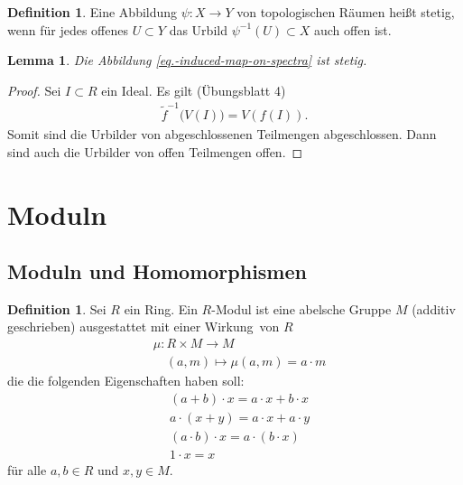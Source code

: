 \documentclass[reqno,12pt]{article}
\numberwithin{equation}{section}
\newcommand{\wt}{\widetilde}
\theoremstyle{plain}
\newtheorem{lemma}[thm]{Lemma}
\theoremstyle{definition}
\newtheorem{definition}[thm]{Definition}
\begin{document}
\begin{definition}
  Eine Abbildung $\psi \colon X \to Y$ von topologischen Räumen heißt {\sf stetig}, wenn für jedes offenes $U \subset Y$ das Urbild $\psi^{-1}(U) \subset X$ auch offen ist.
\end{definition}


\begin{lemma}
Die Abbildung \eqref{eq.-induced-map-on-spectra} ist stetig.
\end{lemma}



\begin{proof}
Sei $I \subset R$ ein Ideal. Es gilt (Übungsblatt 4)
\begin{align*}
\wt{f}^{-1}\big( V(I) \big) = V(f(I)).
\end{align*}
Somit sind die Urbilder von abgeschlossenen Teilmengen abgeschlossen. Dann sind auch die Urbilder von offen Teilmengen offen.
\end{proof}












\section{Moduln}

\subsection{Moduln und Homomorphismen}

\begin{definition}
Sei $R$ ein Ring. Ein $R$-Modul ist eine abelsche Gruppe $M$ (additiv geschrieben) ausgestattet mit einer \glqq Wirkung\grqq\, von $R$
\begin{align*}
  & \mu \colon R \times M \to M \\
  & \quad  (a,m) \mapsto \mu(a,m) = a \cdot m
\end{align*}
die die folgenden Eigenschaften haben soll:
\begin{align*}
  & (a+b) \cdot x = a \cdot x + b \cdot x \\
  & a \cdot (x+y) = a \cdot x + a \cdot y \\
  & (a \cdot b) \cdot x = a \cdot (b \cdot x) \\
  & 1 \cdot x = x
\end{align*}
für alle $a,b \in R$ und $x,y \in M$.
\end{definition}
\end{document}
